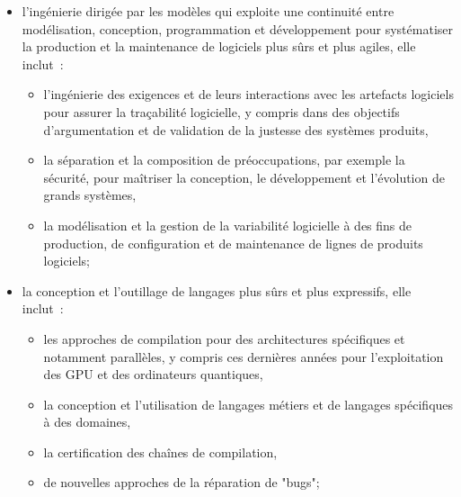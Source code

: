 \documentclass[11pt]{article}
\begin{document}
\begin{itemize}
  \renewcommand{\labelitemi}{$\bullet$}
\item l'ingénierie dirigée par les modèles qui exploite une continuité entre  modélisation, conception, programmation et développement pour systématiser la production et la maintenance de logiciels plus sûrs et plus agiles, elle inclut~:
\begin{itemize}
\item l'ingénierie des exigences et de leurs interactions avec les artefacts logiciels pour assurer la traçabilité logicielle, y compris dans des objectifs d'argumentation et de validation de la justesse des systèmes produits, 
\item la séparation et la composition de préoccupations, par exemple la sécurité, pour maîtriser la conception, le développement et l'évolution de grands systèmes, 
\item la modélisation et la gestion de la variabilité logicielle à des fins de production, de configuration et de maintenance de lignes de produits logiciels;
\end{itemize}

\item la conception et l'outillage de langages plus sûrs et plus expressifs,  elle inclut~: 
\begin{itemize}
\item les approches de compilation pour des architectures spécifiques et notamment parallèles, y compris ces dernières années pour l'exploitation des GPU et  des ordinateurs quantiques,
\item la conception et l'utilisation de langages métiers et de langages spécifiques à des domaines,
\item la certification des chaînes de compilation,
\item de nouvelles approches de la réparation de "bugs";
\end{itemize}


\end{itemize}
\end{document}
